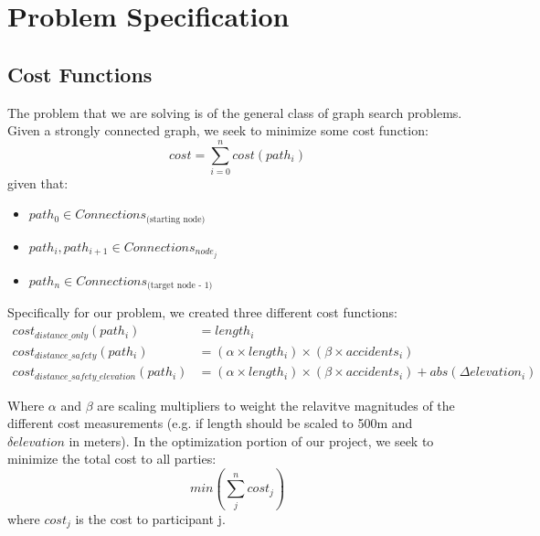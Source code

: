 \documentclass[11pt]{article}
\begin{document}
\section{Problem Specification}
\subsection{Cost Functions}
The problem that we are solving is of the general class of graph search problems. Given a strongly connected graph, we seek to minimize some cost function:
\begin{equation}
cost = \sum_{i=0}^n cost(path_i)
\end{equation}
given that:
\begin{itemize}
\item $path_0 \in Connections_{\text{(starting node)}}$
\item $path_i, path_{i+1} \in Connections_{node_j}$
\item $path_n \in Connections_{\text{(target node - 1)}}$
\end{itemize}

\noindent Specifically for our problem, we created three different cost functions:
\begin{align}\label{cost_fns}
cost_{distance\_only}(path_i) &= length_i \\
cost_{distance\_safety}(path_i) &= (\alpha \times length_i) \times  (\beta \times accidents_i) \\
cost_{distance\_safety\_elevation}(path_i) &= (\alpha \times length_i) \times  (\beta \times accidents_i) + abs(\Delta elevation_i)
\end{align}


\noindent Where $\alpha$ and $\beta$ are scaling multipliers to weight the relavitve magnitudes of the different cost measurements (e.g. if length should be scaled to 500m and $\delta elevation$ in meters). In the optimization portion of our project, we seek to minimize the total cost to all parties:
\begin{equation}
min(\sum_j^n cost_j)
\end{equation}
where $cost_j$ is the cost to participant j.
\end{document}
